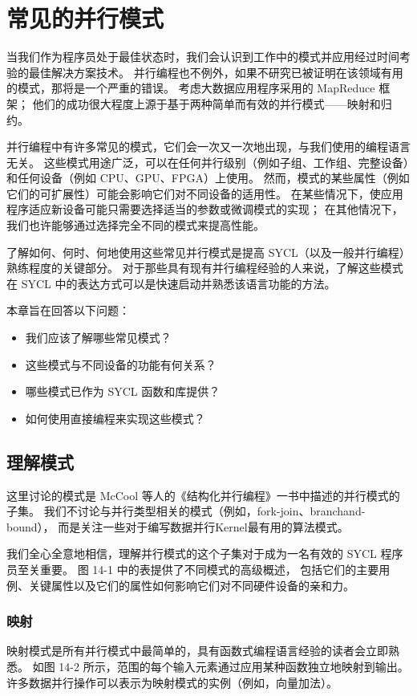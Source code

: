\section{常见的并行模式}
当我们作为程序员处于最佳状态时，我们会认识到工作中的模式并应用经过时间考验的最佳解决方案技术。 
并行编程也不例外，如果不研究已被证明在该领域有用的模式，那将是一个严重的错误。 
考虑大数据应用程序采用的 MapReduce 框架； 他们的成功很大程度上源于基于两种简单而有效的并行模式——映射和归约。

并行编程中有许多常见的模式，它们会一次又一次地出现，与我们使用的编程语言无关。 
这些模式用途广泛，可以在任何并行级别（例如子组、工作组、完整设备）和任何设备（例如 CPU、GPU、FPGA）上使用。 
然而，模式的某些属性（例如它们的可扩展性）可能会影响它们对不同设备的适用性。 
在某些情况下，使应用程序适应新设备可能只需要选择适当的参数或微调模式的实现； 
在其他情况下，我们也许能够通过选择完全不同的模式来提高性能。

了解如何、何时、何地使用这些常见并行模式是提高 SYCL（以及一般并行编程）熟练程度的关键部分。 
对于那些具有现有并行编程经验的人来说，了解这些模式在 SYCL 中的表达方式可以是快速启动并熟悉该语言功能的方法。

本章旨在回答以下问题：

\begin{itemize}
	\item 我们应该了解哪些常见模式？

	\item 这些模式与不同设备的功能有何关系？

	\item 哪些模式已作为 SYCL 函数和库提供？

	\item 如何使用直接编程来实现这些模式？
\end{itemize}


\subsection{理解模式}
这里讨论的模式是 McCool 等人的《结构化并行编程》一书中描述的并行模式的子集。 
我们不讨论与并行类型相关的模式（例如，fork-join、branchand-bound），
而是关注一些对于编写数据并行Kernel最有用的算法模式。

我们全心全意地相信，理解并行模式的这个子集对于成为一名有效的 SYCL 程序员至关重要。 
图 14-1 中的表提供了不同模式的高级概述，
包括它们的主要用例、关键属性以及它们的属性如何影响它们对不同硬件设备的亲和力。

\subsubsection{映射}
映射模式是所有并行模式中最简单的，具有函数式编程语言经验的读者会立即熟悉。 
如图 14-2 所示，范围的每个输入元素通过应用某种函数独立地映射到输出。 
许多数据并行操作可以表示为映射模式的实例（例如，向量加法）。

